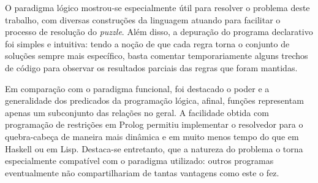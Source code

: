 O paradigma lógico mostrou-se especialmente útil para resolver o problema deste trabalho, com diversas construções da linguagem atuando para facilitar o processo de resolução do \textit{puzzle}.
Além disso, a depuração do programa declarativo foi simples e intuitiva: tendo a noção de que cada regra torna o conjunto de soluções sempre mais específico, basta comentar temporariamente alguns trechos de código para observar os resultados parciais das regras que foram mantidas.

Em comparação com o paradigma funcional, foi destacado o poder e a generalidade dos predicados da programação lógica, afinal, funções representam apenas um subconjunto das relações no geral.
A facilidade obtida com programação de restrições em Prolog permitiu implementar o resolvedor para o quebra-cabeça de maneira mais dinâmica e em muito menos tempo do que em Haskell ou em Lisp.
Destaca-se entretanto, que a natureza do problema o torna especialmente compatível com o paradigma utilizado: outros programas eventualmente não compartilhariam de tantas vantagens como este o fez.
